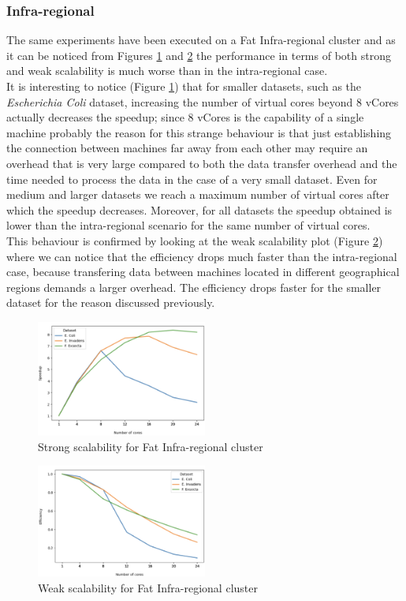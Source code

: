 \documentclass[final,5p,times,twocolumn,authoryear]{elsarticle}
\begin{document}
\subsubsection{Infra-regional}
The same experiments have been executed on a Fat Infra-regional cluster and as it can be noticed from Figures \ref{fig:fat-infra-strong} and \ref{fig:fat-infra-weak} the performance in terms of both strong and weak scalability is much worse than in the intra-regional case. \\
It is interesting to notice (Figure \ref{fig:fat-infra-strong}) that for smaller datasets, such as the \emph{Escherichia Coli} dataset, increasing the number of virtual cores beyond 8 vCores actually decreases the speedup; since 8 vCores is the capability of a single machine probably the reason for this strange behaviour is that just establishing the connection between machines far away from each other may require an overhead that is very large compared to both the data transfer overhead and the time needed to process the data in the case of a very small dataset. Even for medium and larger datasets we reach a maximum number of virtual cores after which the speedup decreases. Moreover, for all datasets the speedup obtained is lower than the intra-regional scenario for the same number of virtual cores. \\ 
This behaviour is confirmed by looking at the weak scalability plot (Figure \ref{fig:fat-infra-weak}) where we can notice that the efficiency drops much faster than the intra-regional case, because transfering data between machines located in different geographical regions demands a larger overhead. The efficiency drops faster for the smaller dataset for the reason discussed previously. \\
\begin{figure}
    \centering
    \includegraphics[width=0.5\textwidth]{images/fat_infra_strong.png}
    \caption{Strong scalability for Fat Infra-regional cluster }
    \label{fig:fat-infra-strong}
\end{figure}
\begin{figure}
    \centering
    \includegraphics[width=0.5\textwidth]{images/fat_infra_weak.png}
    \caption{Weak scalability for Fat Infra-regional cluster }
    \label{fig:fat-infra-weak}
\end{figure}
\end{document}
